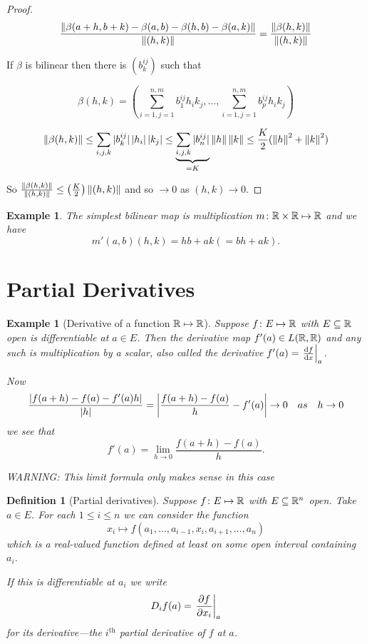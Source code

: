 \documentclass{notes}
\theoremstyle{plain}
\newtheorem{definition}[proposition]{Definition}
\newtheorem{example}[proposition]{Example}
\begin{document}
\begin{proof}
\[ \frac{ 
\left\|\beta(a+h,b+k)-\beta(a,b)-\beta(h,b)-\beta(a,k)\right\|}{\left\| 
(h,k)\right\|} = \frac{\left\|\beta(h,k)\right\|}{\left\|(h,k)\right\|} \]

If $ \beta $ is bilinear then there is $ (b_k^{ij}) $ such that 

\[ \beta(h,k)=\left( \sum_{i=1,j=1}^{n,m}b_1^{ij}h_{i}k_{j}, 
\ldots, \sum_{i=1,j=1}^{n,m}b_p^{ij}h_{i}k_{j} \right) \]

\[ \left\|\beta(h,k)\right\| \leq \sum_{i,j,k}|b_k^{ij}| \, |h_{i}| \, 
|k_{j}| \leq 
\underbrace{\sum_{i,j,k}|b_{n}^{ij}|}_{=K}\left\|h\right\|\left\|k\right\| \leq 
\frac{K}{2}( \left\|h\right\|^{2}+\left\|k\right\|^{2}) \]

So $ \frac{\left\|\beta(h,k)\right\|}{\left\|(h,k)\right\|} \leq \left( \frac{K}{2} 
\right) \left\|(h,k)\right\| $ and so $ \to 0 $ as $ (h,k) 
\to 0 $.
\end{proof}


\begin{example}
The simplest bilinear map is multiplication $ m\colon \mathbb{R} \times \mathbb{R} 
\mapsto \mathbb{R} $ and we have
\[ m'(a,b)(h,k) = hb+ak (=bh+ak). \]
\end{example}

\section{Partial Derivatives}

\begin{example}[Derivative of a function $\mathbb{R} \mapsto \mathbb{R}$]
Suppose $ f\colon E \mapsto \mathbb{R} $ with $ E \subseteq \mathbb{R} $ open is 
differentiable at $ a \in E $. Then the derivative map $ f'(a) \in 
L(\mathbb{R}, \mathbb{R}) $ and any such is multiplication by a scalar, also called 
the derivative $f'(a) = \left.\frac{\mathrm{d} f}{\mathrm{d} x}\right|_{a}$.

Now
\[ \frac{ \left|f(a+h)-f(a)-f'(a)h\right|}{\left|h\right|} = \left| 
\frac{f(a+h)-f(a)}{h}-f'(a) \right| \to 0 \quad as \quad h
 \to 0 \]
we see that
\[
f'(a) = \lim_{h \to 0}\frac{f(a+h)-f(a)}{h}.
\]

WARNING: This limit formula only makes sense in this case
\end{example}

\begin{definition}[Partial derivatives]
Suppose $ f\colon E \mapsto \mathbb{R} $ with $ E \subseteq \mathbb{R}^{n} $ open. 
Take $ a \in E $. For each $ 1 \leq i \leq n $ we can consider the function
\[
x_{i} \mapsto f(a_{1},\ldots,a_{i-1},x_{i},a_{i+1},\ldots,a_{n})
\]
which is a real-valued function defined at least on some open 
interval containing $ a_{i} $.

If this is differentiable at $ a_{i} $ we write
\[
D_{i}f(a)= 
\left.\frac{\partial f}{\partial x_{i}}\right|_{a}
\]
for its derivative---the $i^{\text{th}}$ partial derivative of $ f $ at $ a $.
\end{definition}
\end{document}
